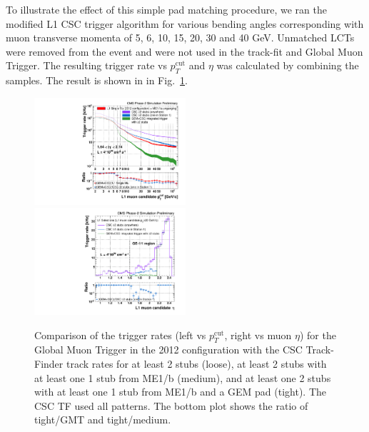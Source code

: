 To illustrate the effect of this simple pad matching procedure, we ran the modified L1 CSC trigger algorithm for various bending angles corresponding with muon transverse momenta of 5, 6, 10, 15, 20, 30 and 40 GeV. Unmatched LCTs were removed from the event and were not used in the track-fit and Global Muon Trigger. The resulting trigger rate vs $p_T^\text{cut}$ and $\eta$ was calculated by combining the samples. The result is shown in in Fig.~\ref{fig:l1_trigger_rate_csc_gem}. 

\begin{figure}[htb]
\includegraphics[width=0.5\textwidth]{figures/rates_vs_pt__PU100__def_2s_2s1b_2s1bgem__loose.pdf}
\includegraphics[width=0.5\textwidth]{figures/rates_vs_eta__minpt20__PU100__def_2s_2s1b_2s1bgem.pdf}
\caption{Comparison of the trigger rates (left vs $p_T^\text{cut}$, right vs muon  $\eta$) for the Global Muon Trigger in the 2012 configuration with the CSC Track-Finder track rates for at least 2 stubs (loose), at least 2 stubs with at least one 1 stub from ME1/b (medium), and at least one 2 stubs with at least one 1 stub from ME1/b and a GEM pad (tight). The CSC TF used all patterns. The bottom plot shows the ratio of tight/GMT and tight/medium.}
\label{fig:l1_trigger_rate_csc_gem}
\end{figure}

